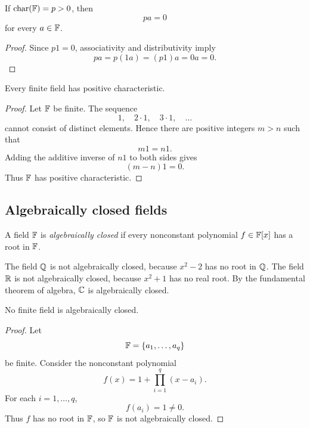 \begin{proposition}
  If $\operatorname{char}(\mathbb{F})=p>0$, then
  \[
    pa=0
  \]
  for every $a\in\mathbb{F}$.
\end{proposition}

\begin{proof}
  Since $p1=0$, associativity and distributivity imply
  \[
    pa=p(1a)=(p1)a=0a=0.
  \]
\end{proof}

\begin{proposition}
  Every finite field has positive characteristic.
\end{proposition}

\begin{proof}
  Let $\mathbb{F}$ be finite. The sequence
  \[
    1,\quad 2\cdot1,\quad 3\cdot1,\quad\ldots
  \]
  cannot consist of distinct elements. Hence there are positive integers
  $m>n$ such that
  \[
    m1=n1.
  \]
  Adding the additive inverse of $n1$ to both sides gives
  \[
    (m-n)1=0.
  \]
  Thus $\mathbb{F}$ has positive characteristic.
\end{proof}

\subsection{Algebraically closed fields}

\begin{definition}
  A field $\mathbb{F}$ is \emph{algebraically closed} if every nonconstant
  polynomial $f\in\mathbb{F}[x]$ has a root in $\mathbb{F}$.
\end{definition}

The field $\mathbb{Q}$ is not algebraically closed, because $x^2-2$ has no
root in $\mathbb{Q}$. The field $\mathbb{R}$ is not algebraically closed, because
$x^2+1$ has no real root. By the fundamental theorem of algebra,
$\mathbb{C}$ is algebraically closed.

\begin{proposition}
  No finite field is algebraically closed.
\end{proposition}

\begin{proof}
  Let
  \[
    \mathbb{F}=\{a_1,\ldots,a_q\}
  \]
  be finite. Consider the nonconstant polynomial
  \[
    f(x)=1+\prod_{i=1}^q(x-a_i).
  \]
  For each $i=1,\ldots,q$,
  \[
    f(a_i)=1\neq0.
  \]
  Thus $f$ has no root in $\mathbb{F}$, so $\mathbb{F}$ is not algebraically
  closed.
\end{proof}

